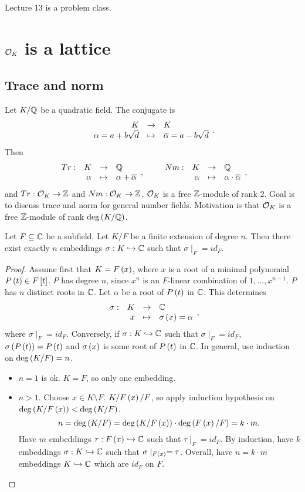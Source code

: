 
Lecture 13 is a problem class.

\pagebreak

\section{$ \mathcal{O}_K $ is a lattice}


\subsection{Trace and norm}

Let $ K / \mathbb{Q} $ be a quadratic field. The conjugate is
$$ \function{K}{K}{\alpha = a + b\sqrt{d}}{\overline{\alpha} = a - b\sqrt{d}}. $$
Then
$$ \function[Tr]{K}{\Q}{\alpha}{\alpha + \overline{\alpha}}, \qquad \function[Nm]{K}{\Q}{\alpha}{\alpha \cdot \overline{\alpha}}, $$
and $ Tr : \mathcal{O}_K \to \mathbb{Z} $ and $ Nm : \mathcal{O}_K \to \mathbb{Z} $. $ \mathcal{O}_K $ is a free $ \mathbb{Z} $-module of rank $ 2 $. Goal is to discuss trace and norm for general number fields. Motivation is that $ \mathcal{O}_K $ is a free $ \mathbb{Z} $-module of rank $ \deg\left( K / \mathbb{Q} \right) $.

\begin{proposition}
\label{prop:embeddings}
Let $ F \subseteq \mathbb{C} $ be a subfield. Let $ K / F $ be a finite extension of degree $ n $. Then there exist exactly $ n $ embeddings $ \sigma : K \hookrightarrow \mathbb{C} $ such that $ \sigma \mid_F = id_F $.
\end{proposition}

\begin{proof}
Assume first that $ K = F\left( x \right) $, where $ x $ is a root of a minimal polynomial $ P\left( t \right) \in F\left[ t \right] $. $ P $ has degree $ n $, since $ x^n $ is an $ F $-linear combination of $ 1, \dots, x^{n - 1} $. $ P $ has $ n $ distinct roots in $ \mathbb{C} $. Let $ \alpha $ be a root of $ P\left( t \right) $ in $ \mathbb{C} $. This determines
$$ \function[\sigma]{K}{\C}{x}{\sigma\rb{x} = \alpha}, $$
where $ \sigma \mid_F = id_F $. Conversely, if $ \sigma : K \hookrightarrow \mathbb{C} $ such that $ \sigma \mid_F = id_F $, $ \sigma\left( P\left( t \right) \right) = P\left( t \right) $ and $ \sigma\left( x \right) $ is some root of $ P\left( t \right) $ in $ \mathbb{C} $. In general, use induction on $ \deg\left( K / F \right) = n $.
\begin{itemize}
\item $ n = 1 $ is ok. $ K = F $, so only one embedding.
\item $ n > 1 $. Choose $ x \in K \setminus F $. $ K / F\left( x \right) / F $, so apply induction hypothesis on $ \deg\left( K / F\left( x \right) \right) < \deg\left( K / F \right) $.
$$ n = \deg\left( K / F \right) = \deg\left( K / F\left( x \right) \right) \cdot \deg\left( F\left( x \right) / F \right) = k \cdot m. $$
Have $ m $ embeddings $ \tau : F\left( x \right) \hookrightarrow \mathbb{C} $ such that $ \tau \mid_F = id_F $. By induction, have $ k $ embeddings $ \sigma : K \hookrightarrow \mathbb{C} $ such that $ \sigma \mid_{F\left( x \right)} = \tau $. Overall, have $ n = k \cdot m $ embeddings $ K \hookrightarrow \mathbb{C} $ which are $ id_F $ on $ F $.
\end{itemize}
\end{proof}

